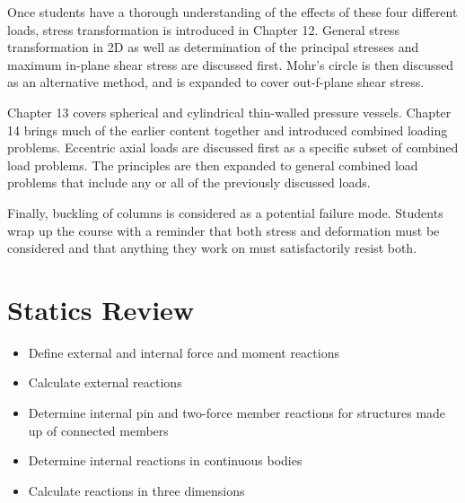 \documentclass[
  letterpaper,
  DIV=11,
  numbers=noendperiod]{scrreprt}
\providecommand{\tightlist}{%
  \setlength{\itemsep}{0pt}\setlength{\parskip}{0pt}}\usepackage{longtable,booktabs,array}
\theoremstyle{definition}
\theoremstyle{remark}
\begin{document}
Once students have a thorough understanding of the effects of these four
different loads, stress transformation is introduced in Chapter 12.
General stress transformation in 2D as well as determination of the
principal stresses and maximum in-plane shear stress are discussed
first. Mohr's circle is then discussed as an alternative method, and is
expanded to cover out-f-plane shear stress.

Chapter 13 covers spherical and cylindrical thin-walled pressure
vessels. Chapter 14 brings much of the earlier content together and
introduced combined loading problems. Eccentric axial loads are
discussed first as a specific subset of combined load problems. The
principles are then expanded to general combined load problems that
include any or all of the previously discussed loads.

Finally, buckling of columns is considered as a potential failure mode.
Students wrap up the course with a reminder that both stress and
deformation must be considered and that anything they work on must
satisfactorily resist both.


\chapter{Statics Review}\label{sec-statics}

\begin{tcolorbox}[enhanced jigsaw, left=2mm, toptitle=1mm, breakable, coltitle=black, colbacktitle=quarto-callout-note-color!10!white, opacitybacktitle=0.6, bottomrule=.15mm, titlerule=0mm, leftrule=.75mm, colframe=quarto-callout-note-color-frame, bottomtitle=1mm, opacityback=0, title={Learning Objectives}, arc=.35mm, colback=white, rightrule=.15mm, toprule=.15mm]

\begin{itemize}
\tightlist
\item
  Define external and internal force and moment reactions
\item
  Calculate external reactions
\item
  Determine internal pin and two-force member reactions for structures
  made up of connected members
\item
  Determine internal reactions in continuous bodies
\item
  Calculate reactions in three dimensions
\end{itemize}

\end{tcolorbox}
\end{document}
